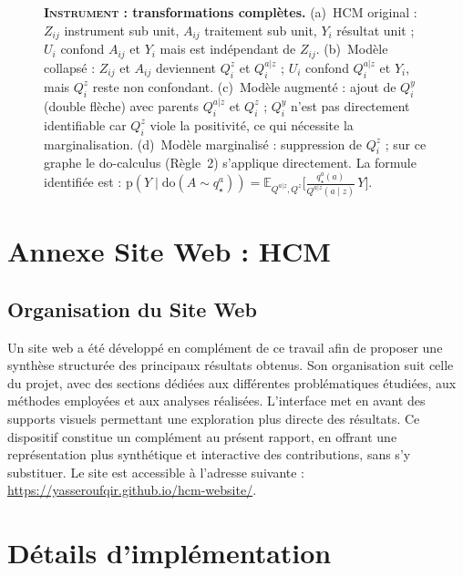 \documentclass[11pt,a4paper]{article}
\newcommand{\pr}{\mathrm{p}}
\begin{document}
\begin{figure}[H]
\begin{subfigure}[t]{0.22\textwidth}
\end{subfigure}
\caption{\textbf{\textsc{Instrument} : transformations complètes.}
(a)~HCM original : $Z_{ij}$ instrument sub unit, $A_{ij}$ traitement sub unit, $Y_i$ résultat unit ; $U_i$ confond $A_{ij}$ et $Y_i$ mais est indépendant de $Z_{ij}$.
(b)~Modèle collapsé : $Z_{ij}$ et $A_{ij}$ deviennent $Q^z_i$ et $Q^{a|z}_i$ ; $U_i$ confond $Q^{a|z}_i$ et $Y_i$, mais $Q^z_i$ reste non confondant.
(c)~Modèle augmenté : ajout de $Q^y_i$ (double flèche) avec parents $Q^{a|z}_i$ et $Q^z_i$ ; $Q^y_i$ n'est pas directement identifiable car $Q^z_i$ viole la positivité, ce qui nécessite la marginalisation.
(d)~Modèle marginalisé : suppression de $Q^z_i$ ; sur ce graphe le do-calculus (Règle~2) s'applique directement.
La formule identifiée est :
$\pr(Y \mid \mathrm{do}(A{\sim}q^a_\star))
  = \mathbb{E}_{Q^{a|z},Q^z}\!\bigl[\frac{q^a_\star(a)}{Q^{a|z}(a\mid z)}\,Y\bigr]$.}
\label{fig:app_instrument}
\end{figure}

\section{Annexe Site Web : HCM}
\label{app:starplots}

\subsection{Organisation du Site Web}

Un site web a été développé en complément de ce travail afin de proposer une synthèse structurée des principaux résultats obtenus. Son organisation suit celle du projet, avec des sections dédiées aux différentes problématiques étudiées, aux méthodes employées et aux analyses réalisées. L’interface met en avant des supports visuels permettant une exploration plus directe des résultats. Ce dispositif constitue un complément au présent rapport, en offrant une représentation plus synthétique et interactive des contributions, sans s’y substituer. Le site est accessible à l’adresse suivante : \url{https://yasseroufqir.github.io/hcm-website/}.

\section{Détails d'implémentation}
\label{app:implementation_details}
\end{document}
